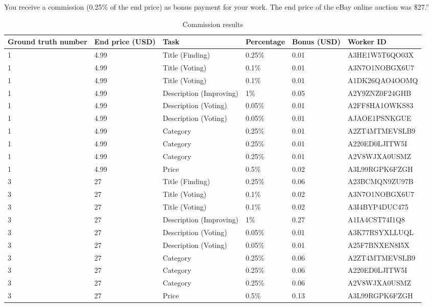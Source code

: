 You receive a commission (0.25\% of the end price) as bonus payment for your work. The end price of the eBay online auction was \$27.''
\begin{table}[h!]
	\begin{center}
	\begin{tabular}{| p{1.16cm} | p{2.16cm} | p{2.16cm} | p{1.66cm} | p{2.16cm} | p{3.66cm} |}
		\hline
		Ground truth number & End price (USD) & Task & Percentage & Bonus (USD) & Worker ID \\
		\hline
		1 & 4.99 & Title (Finding) & 0.25\% & 0.01 & A3HE1W5T6QO03X \\
		\hline
		1 & 4.99 & Title (Voting) & 0.1\% & 0.01 & A3N7O1NOBGX6U7 \\
		\hline
		1 & 4.99 & Title (Voting) & 0.1\% & 0.01 & A1DK26QAO4OOMQ \\
		\hline
		1 & 4.99 & Description (Improving) & 1\% & 0.05 & A2Y9ZNZ0F24GHB \\
		\hline
		1 & 4.99 & Description (Voting) & 0.05\% & 0.01 & A2FF8HA1OWKS83 \\
		\hline
		1 & 4.99 & Description (Voting) & 0.05\% & 0.01 & AJAOE1PSNKGUE \\
		\hline
		1 & 4.99 & Category & 0.25\% & 0.01 & A2ZT4MTMEVSLB9 \\
		\hline
		1 & 4.99 & Category & 0.25\% & 0.01 & A220ED0LJITW5I \\
		\hline
		1 & 4.99 & Category & 0.25\% & 0.01 & A2V8WJXA0USMZ \\
		\hline
		1 & 4.99 & Price & 0.5\% & 0.02 & A3L99RGPK6FZGH \\
		\hline
		3 & 27 & Title (Finding) & 0.25\% & 0.06 & A23BCMQN9ZU97B \\
		\hline
		3 & 27 & Title (Voting) & 0.1\% & 0.02 & A3N7O1NOBGX6U7 \\
		\hline
		3 & 27 & Title (Voting) & 0.1\% & 0.02 & A3I4BYP4DUC475 \\
		\hline
		3 & 27 & Description (Improving) & 1\% & 0.27 & A1IA4CST74I1Q8 \\
		\hline
		3 & 27 & Description (Voting) & 0.05\% & 0.01 & A3K77RSYXLLUQL \\
		\hline
		3 & 27 & Description (Voting) & 0.05\% & 0.01 & A25F7BNXEN8I5X \\
		\hline
		3 & 27 & Category & 0.25\% & 0.06 & A2ZT4MTMEVSLB9 \\
		\hline
		3 & 27 & Category & 0.25\% & 0.06 & A220ED0LJITW5I \\
		\hline
		3 & 27 & Category & 0.25\% & 0.06 & A2V8WJXA0USMZ \\
		\hline
		3 & 27 & Price & 0.5\% & 0.13 & A3L99RGPK6FZGH \\
		\hline
	\end{tabular}
	\end{center}
	\caption{Commission results}
\end{table}



